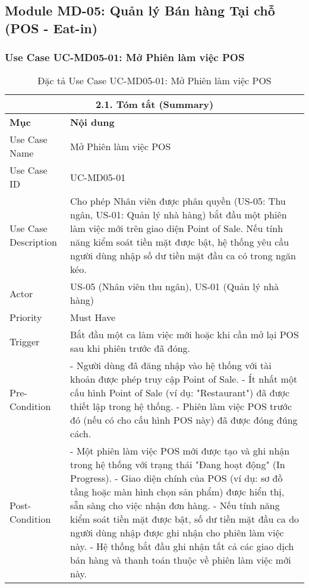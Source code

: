 \subsection{Module MD-05: Quản lý Bán hàng Tại chỗ (POS - Eat-in)}
\subsubsection{Use Case UC-MD05-01: Mở Phiên làm việc POS}
\begin{longtable}{|m{4cm}|p{11cm}|}
\caption{Đặc tả Use Case UC-MD05-01: Mở Phiên làm việc POS} \label{tab:uc_md05_01_final} \\
\hline
\multicolumn{2}{|c|}{\textbf{2.1. Tóm tắt (Summary)}} \\
\hline
\textbf{Mục} & \textbf{Nội dung} \\
\hline
\endhead %
\hline
\endfoot %
\hline
\endlastfoot %
Use Case Name & Mở Phiên làm việc POS \\
\hline
Use Case ID & UC-MD05-01 \\
\hline
Use Case Description & Cho phép Nhân viên được phân quyền (US-05: Thu ngân, US-01: Quản lý nhà hàng) bắt đầu một phiên làm việc mới trên giao diện Point of Sale. Nếu tính năng kiểm soát tiền mặt được bật, hệ thống yêu cầu người dùng nhập số dư tiền mặt đầu ca có trong ngăn kéo. \\
\hline
Actor & US-05 (Nhân viên thu ngân), US-01 (Quản lý nhà hàng) \\
\hline
Priority & Must Have \\
\hline
Trigger & Bắt đầu một ca làm việc mới hoặc khi cần mở lại POS sau khi phiên trước đã đóng. \\
\hline
Pre-Condition & - Người dùng đã đăng nhập vào hệ thống với tài khoản được phép truy cập Point of Sale. \newline - Ít nhất một cấu hình Point of Sale (ví dụ: "Restaurant") đã được thiết lập trong hệ thống. \newline - Phiên làm việc POS trước đó (nếu có cho cấu hình POS này) đã được đóng đúng cách. \\
\hline
Post-Condition & - Một phiên làm việc POS mới được tạo và ghi nhận trong hệ thống với trạng thái "Đang hoạt động" (In Progress). \newline - Giao diện chính của POS (ví dụ: sơ đồ tầng hoặc màn hình chọn sản phẩm) được hiển thị, sẵn sàng cho việc nhận đơn hàng. \newline - Nếu tính năng kiểm soát tiền mặt được bật, số dư tiền mặt đầu ca do người dùng nhập được ghi nhận cho phiên làm việc này. \newline - Hệ thống bắt đầu ghi nhận tất cả các giao dịch bán hàng và thanh toán thuộc về phiên làm việc mới này. \\

\end{longtable}

